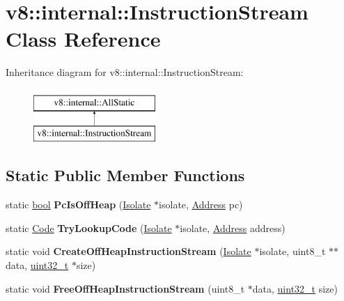 \hypertarget{classv8_1_1internal_1_1InstructionStream}{}\section{v8\+:\+:internal\+:\+:Instruction\+Stream Class Reference}
\label{classv8_1_1internal_1_1InstructionStream}
Inheritance diagram for v8\+:\+:internal\+:\+:Instruction\+Stream\+:\begin{figure}[H]
\begin{center}
\leavevmode
\includegraphics[height=2.000000cm]{classv8_1_1internal_1_1InstructionStream}
\end{center}
\end{figure}
\subsection*{Static Public Member Functions}
\begin{DoxyCompactItemize}
\item 
\mbox{\label{classv8_1_1internal_1_1InstructionStream_a9c19a94e23be0d4d0ac1cdec20204407}} 
static \mbox{\hyperlink{classbool}{bool}} {\bfseries Pc\+Is\+Off\+Heap} (\mbox{\hyperlink{classv8_1_1internal_1_1Isolate}{Isolate}} $\ast$isolate, \mbox{\hyperlink{classuintptr__t}{Address}} pc)
\item 
\mbox{\label{classv8_1_1internal_1_1InstructionStream_a6c0ce3f8e3fefeabb5e9e73b3a624303}} 
static \mbox{\hyperlink{classv8_1_1internal_1_1Code}{Code}} {\bfseries Try\+Lookup\+Code} (\mbox{\hyperlink{classv8_1_1internal_1_1Isolate}{Isolate}} $\ast$isolate, \mbox{\hyperlink{classuintptr__t}{Address}} address)
\item 
\mbox{\label{classv8_1_1internal_1_1InstructionStream_a84c679d08ad7728c69d013ed623638d5}} 
static void {\bfseries Create\+Off\+Heap\+Instruction\+Stream} (\mbox{\hyperlink{classv8_1_1internal_1_1Isolate}{Isolate}} $\ast$isolate, uint8\+\_\+t $\ast$$\ast$data, \mbox{\hyperlink{classuint32__t}{uint32\+\_\+t}} $\ast$size)
\item 
\mbox{\label{classv8_1_1internal_1_1InstructionStream_ac13bda908b53d840049ac2a618b05d03}} 
static void {\bfseries Free\+Off\+Heap\+Instruction\+Stream} (uint8\+\_\+t $\ast$data, \mbox{\hyperlink{classuint32__t}{uint32\+\_\+t}} size)
\end{DoxyCompactItemize}


